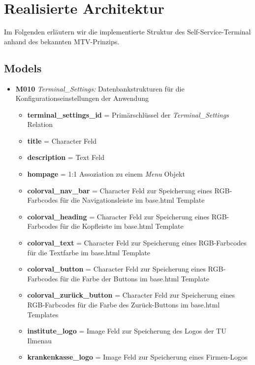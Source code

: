 \section{Realisierte Architektur}

Im Folgenden erläutern wir die implementierte Struktur des Self-Service-Terminal anhand des bekannten MTV-Prinzips.

\subsection{Models}
\begin{itemize}
    \item \textbf{M010} \textit{Terminal\_Settings:} Datenbankstrukturen für die Konfigurationseinstellungen der Anwendung
    \begin{itemize}
        \item \textbf{terminal\_settings\_id} = Primärschlüssel der \textit{Terminal\_Settings} Relation
        \item \textbf{title} = Character Feld
        \item \textbf{description} = Text Feld
        \item \textbf{hompage} = 1:1 Assoziation zu einem \textit{Menu} Objekt
        \item \textbf{colorval\_nav\_bar} = Character Feld zur Speicherung eines RGB-Farbcodes für die Navigationsleiste im base.html Template
        \item \textbf{colorval\_heading} = Character Feld zur Speicherung eines RGB-Farbcodes für die Kopfleiste im base.html Template
        \item \textbf{colorval\_text} = Character Feld zur Speicherung eines RGB-Farbcodes für die Textfarbe im base.html Template
        \item \textbf{colorval\_button} = Character Feld zur Speicherung eines RGB-Farbcodes für die Farbe der Buttons im base.html Template
        \item \textbf{colorval\_zurück\_button} = Character Feld zur Speicherung eines RGB-Farbcodes für die Farbe des Zurück-Buttons im base.html Templates
        \item \textbf{institute\_logo} = Image Feld zur Speicherung des Logos der TU Ilmenau
        \item \textbf{krankenkasse\_logo} = Image Feld zur Speicherung eines Firmen-Logos
    \end{itemize}
\end{itemize}
\newpage

